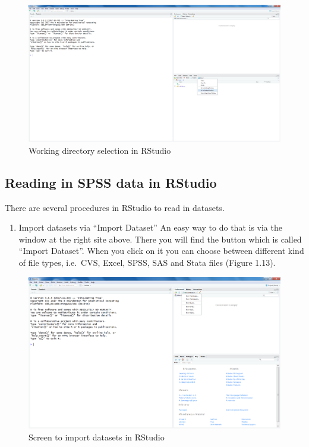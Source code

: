 \documentclass[]{book}
\providecommand{\tightlist}{%
  \setlength{\itemsep}{0pt}\setlength{\parskip}{0pt}}
\theoremstyle{definition}
\theoremstyle{definition}
\theoremstyle{definition}
\theoremstyle{remark}
\begin{document}
\begin{figure}

{\centering \includegraphics[width=0.9\linewidth]{images/fig1.12} 

}

\caption{Working directory selection in RStudio}\label{fig:fig12}
\end{figure}

\subsection{Reading in SPSS data in
RStudio}\label{reading-in-spss-data-in-rstudio}

There are several procedures in RStudio to read in datasets.

\begin{enumerate}
\def\labelenumi{\arabic{enumi}.}
\tightlist
\item
  Import datasets via ``Import Dataset'' An easy way to do that is via
  the window at the right site above. There you will find the button
  which is called ``Import Dataset''. When you click on it you can
  choose between different kind of file types, i.e.~CVS, Excel, SPSS,
  SAS and Stata files (Figure 1.13).
\end{enumerate}

\begin{figure}

{\centering \includegraphics[width=0.9\linewidth]{images/fig1.13} 

}

\caption{Screen to import datasets in RStudio}\label{fig:fig13}
\end{figure}
\end{document}
